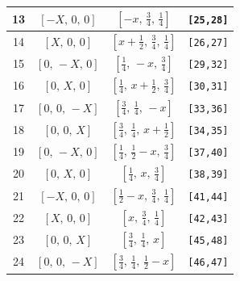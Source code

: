 \documentclass[fleqn,8pt]{jsarticle}
\begin{document}
\begin{longtable}{cccc}
13 & $\left[ - X,\, 0,\, 0 \right]$ & $\left[ - x,\, \frac{3}{4},\, \frac{1}{4} \right]$ & {\tt [25,28]} \\ \hline
14 & $\left[ X,\, 0,\, 0 \right]$ & $\left[ x + \frac{1}{2},\, \frac{3}{4},\, \frac{1}{4} \right]$ & {\tt [26,27]} \\ \hline
15 & $\left[ 0,\, - X,\, 0 \right]$ & $\left[ \frac{1}{4},\, - x,\, \frac{3}{4} \right]$ & {\tt [29,32]} \\ \hline
16 & $\left[ 0,\, X,\, 0 \right]$ & $\left[ \frac{1}{4},\, x + \frac{1}{2},\, \frac{3}{4} \right]$ & {\tt [30,31]} \\ \hline
17 & $\left[ 0,\, 0,\, - X \right]$ & $\left[ \frac{3}{4},\, \frac{1}{4},\, - x \right]$ & {\tt [33,36]} \\ \hline
18 & $\left[ 0,\, 0,\, X \right]$ & $\left[ \frac{3}{4},\, \frac{1}{4},\, x + \frac{1}{2} \right]$ & {\tt [34,35]} \\ \hline
19 & $\left[ 0,\, - X,\, 0 \right]$ & $\left[ \frac{1}{4},\, \frac{1}{2} - x,\, \frac{3}{4} \right]$ & {\tt [37,40]} \\ \hline
20 & $\left[ 0,\, X,\, 0 \right]$ & $\left[ \frac{1}{4},\, x,\, \frac{3}{4} \right]$ & {\tt [38,39]} \\ \hline
21 & $\left[ - X,\, 0,\, 0 \right]$ & $\left[ \frac{1}{2} - x,\, \frac{3}{4},\, \frac{1}{4} \right]$ & {\tt [41,44]} \\ \hline
22 & $\left[ X,\, 0,\, 0 \right]$ & $\left[ x,\, \frac{3}{4},\, \frac{1}{4} \right]$ & {\tt [42,43]} \\ \hline
23 & $\left[ 0,\, 0,\, X \right]$ & $\left[ \frac{3}{4},\, \frac{1}{4},\, x \right]$ & {\tt [45,48]} \\ \hline
24 & $\left[ 0,\, 0,\, - X \right]$ & $\left[ \frac{3}{4},\, \frac{1}{4},\, \frac{1}{2} - x \right]$ & {\tt [46,47]} \\
\end{longtable}
\renewcommand{\arraystretch}{1.2}
\end{document}
